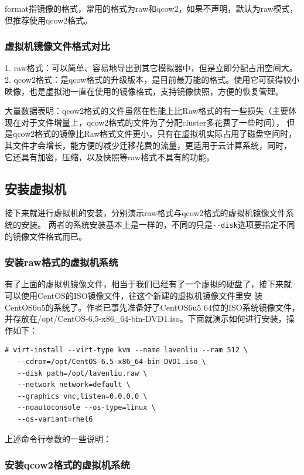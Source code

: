 format指镜像的格式，常用的格式为raw和qcow2，如果不声明，默认为raw模式，
但推荐使用qcow2格式。

\subsubsection{虚拟机镜像文件格式对比}
\label{sec:createImgContrast}

1.	raw格式：可以简单、容易地导出到其它模拟器中，但是立即分配占用空间大。
2.	qcow2格式：是qcow格式的升级版本，是目前最万能的格式。使用它可获得较小映像，也是虚拟池一直在使用的镜像格式，支持镜像快照，方便的恢复管理。

大量数据表明：qcow2格式的文件虽然在性能上比Raw格式的有一些损失（主要体
现在对于文件增量上，qcow2格式的文件为了分配cluster多花费了一些时间），
但是qcow2格式的镜像比Raw格式文件更小，只有在虚拟机实际占用了磁盘空间时，
其文件才会增长，能方便的减少迁移花费的流量，更适用于云计算系统，同时，
它还具有加密，压缩，以及快照等raw格式不具有的功能。

\subsection{安装虚拟机}
\label{sec:installVM}

接下来就进行虚拟机的安装，分别演示raw格式与qcow2格式的虚拟机镜像文件系统的安装。
两者的系统安装基本上是一样的，不同的只是\verb|--disk|选项要指定不同的镜像文件格式而已。

\subsubsection{安装raw格式的虚拟机系统}
\label{sec:installRawVM}

有了上面的虚拟机镜像文件，相当于我们已经有了一个虚拟的硬盘了，接下来就
可以使用CentOS的ISO镜像文件，往这个新建的虚拟机镜像文件里安
装CentOS6u5的系统了。作者已事先准备好了CentOS6u5 64位的ISO系统镜像文件，
并存放在/opt/CentOS-6.5-x86\_64-bin-DVD1.iso。下面就演示如何进行安装，操
作如下：

\begin{verbatim}
# virt-install --virt-type kvm --name lavenliu --ram 512 \
   --cdrom=/opt/CentOS-6.5-x86_64-bin-DVD1.iso \
   --disk path=/opt/lavenliu.raw \
   --network network=default \
   --graphics vnc,listen=0.0.0.0 \
   --noautoconsole --os-type=linux \
   --os-variant=rhel6
\end{verbatim}

上述命令行参数的一些说明：

\subsubsection{安装qcow2格式的虚拟机系统}
\label{sec:installQcow2VM}

